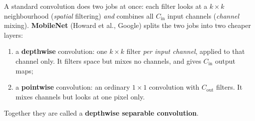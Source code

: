 \documentclass[12pt, a4paper]{article}
\begin{document}
A standard convolution does two jobs at once: each filter looks at a
$k \times k$ neighbourhood (\emph{spatial} filtering) \emph{and} combines all
$C_{\text{in}}$ input channels (\emph{channel} mixing). \textbf{MobileNet}
(Howard et al., Google) splits the two jobs into two cheaper layers:
\begin{enumerate}[nosep]
  \item a \textbf{depthwise} convolution: one $k \times k$ filter \emph{per
          input channel}, applied to that channel only. It filters space but
        mixes no channels, and gives $C_{\text{in}}$ output maps;
  \item a \textbf{pointwise} convolution: an ordinary $1 \times 1$
        convolution with $C_{\text{out}}$ filters. It mixes channels but
        looks at one pixel only.
\end{enumerate}
Together they are called a \textbf{depthwise separable convolution}.
\end{document}
